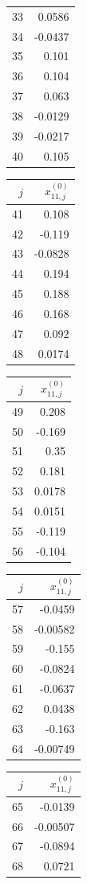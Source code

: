 {\begin{tabular}[t]{r|r}
33 & 0.0586 \\
34 & -0.0437 \\
35 & 0.101 \\
36 & 0.104 \\
37 & 0.063 \\
38 & -0.0129 \\
39 & -0.0217 \\
40 & 0.105
\end{tabular}\kern4pt
\begin{tabular}[t]{r|r}
$j$ & $x^{(0)}_{11,j}$ \\\hline
41 & 0.108 \\
42 & -0.119 \\
43 & -0.0828 \\
44 & 0.194 \\
45 & 0.188 \\
46 & 0.168 \\
47 & 0.092 \\
48 & 0.0174
\end{tabular}\kern4pt
\begin{tabular}[t]{r|r}
$j$ & $x^{(0)}_{11,j}$ \\\hline
49 & 0.208 \\
50 & -0.169 \\
51 & 0.35 \\
52 & 0.181 \\
53 & 0.0178 \\
54 & 0.0151 \\
55 & -0.119 \\
56 & -0.104
\end{tabular}\kern4pt
\begin{tabular}[t]{r|r}
$j$ & $x^{(0)}_{11,j}$ \\\hline
57 & -0.0459 \\
58 & -0.00582 \\
59 & -0.155 \\
60 & -0.0824 \\
61 & -0.0637 \\
62 & 0.0438 \\
63 & -0.163 \\
64 & -0.00749
\end{tabular}\kern4pt
\begin{tabular}[t]{r|r}
$j$ & $x^{(0)}_{11,j}$ \\\hline
65 & -0.0139 \\
66 & -0.00507 \\
67 & -0.0894 \\
68 & 0.0721 \\

\end{tabular}}
